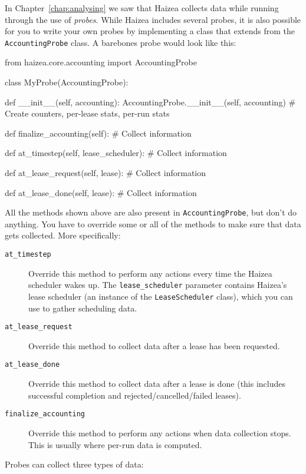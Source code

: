In Chapter~\ref{chap:analysing} we saw that Haizea collects data while running through the use of \emph{probes}. While Haizea includes several probes, it is also possible for you to write your own probes by implementing a class that extends from the \texttt{AccountingProbe} class. A barebones probe would look like this:

\begin{wideshellverbatim}
from haizea.core.accounting import AccountingProbe

class MyProbe(AccountingProbe):
    
    def __init__(self, accounting):
        AccountingProbe.__init__(self, accounting)
        # Create counters, per-lease stats, per-run stats
    
    def finalize_accounting(self):
	# Collect information

    def at_timestep(self, lease_scheduler):
	# Collect information

    def at_lease_request(self, lease):
	# Collect information 

    def at_lease_done(self, lease):
	# Collect information 
\end{wideshellverbatim}

All the methods shown above are also present in \texttt{AccountingProbe}, but don't do anything. You have to override some or all of the methods to make sure that data gets collected. More specifically:

\begin{description}
\item[\texttt{at\_timestep}] Override this method to perform any actions every time the Haizea scheduler wakes up. The \texttt{lease\_scheduler} parameter contains Haizea's lease scheduler (an instance of the \texttt{LeaseScheduler} class), which you can use to gather scheduling data.
\item[\texttt{at\_lease\_request}] Override this method to collect data after a lease has been requested.
\item[\texttt{at\_lease\_done}] Override this method to collect data after a lease is done (this includes successful completion and rejected/cancelled/failed leases).
\item[\texttt{finalize\_accounting}] Override this method to perform any actions when data collection stops. This is usually where per-run data is computed.
\end{description}

Probes can collect three types of data:

